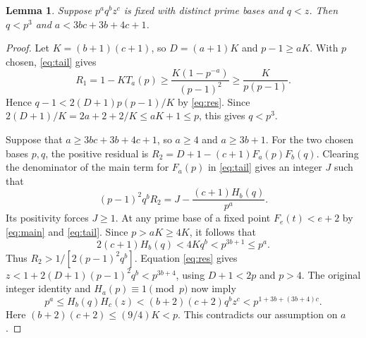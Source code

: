 \documentclass[11pt]{article}
\newtheorem{lemma}[theorem]{Lemma}
\begin{document}
\begin{lemma}\label{lem:single}
Suppose $p^a q^b z^c$ is fixed with distinct prime bases and $q<z$.
Then $q<p^3$ and $a<3bc+3b+4c+1$.
\end{lemma}
\begin{proof}
Let $K=(b+1)(c+1)$, so $D=(a+1)K$ and $p-1\ge aK$.
With $p$ chosen, \eqref{eq:tail} gives
\[
 R_1=1-KT_a(p)\ge\frac{K(1-p^{-a})}{(p-1)^2}
 \ge\frac{K}{p(p-1)}.
\]
Hence $q-1<2(D+1)p(p-1)/K$ by \eqref{eq:res}. Since
$2(D+1)/K=2a+2+2/K\le aK+1\le p$, this gives $q<p^3$.

Suppose that $a\ge3bc+3b+4c+1$, so $a\ge4$ and $a\ge3b+1$.
For the two chosen bases $p,q$, the positive residual is
$R_2=D+1-(c+1)F_a(p)F_b(q)$. Clearing the denominator of the main
term for $F_a(p)$ in \eqref{eq:tail} gives an integer $J$ such that
\[
 (p-1)^2 q^bR_2=J-\frac{(c+1)H_b(q)}{p^a}.
\]
Its positivity forces $J\ge1$. At any prime base of a fixed point
$F_e(t)<e+2$ by \eqref{eq:main} and \eqref{eq:tail}.
Since $p>aK\ge4K$, it follows that
\[
 2(c+1)H_b(q)<4Kq^b<p^{3b+1}\le p^a.
\]
Thus $R_2>1/[2(p-1)^2q^b]$. Equation \eqref{eq:res} gives
$z<1+2(D+1)(p-1)^2q^b<p^{3b+4}$, using $D+1<2p$ and $p>4$.
The original integer identity and $H_a(p)\equiv1\pmod p$ now imply
\[
 p^a\le H_b(q)H_c(z)<(b+2)(c+2)q^b z^c
 <p^{1+3b+(3b+4)c}.
\]
Here $(b+2)(c+2)\le(9/4)K<p$. This contradicts our assumption on $a$.
\end{proof}
\end{document}
